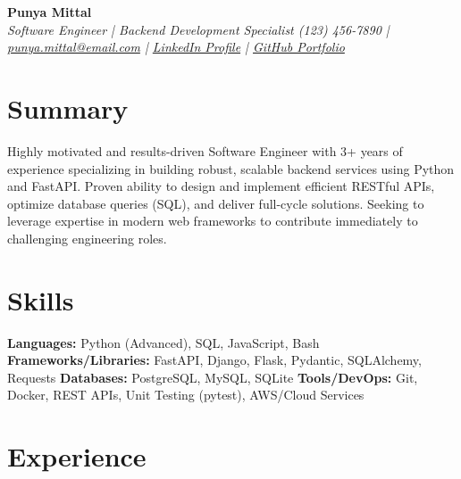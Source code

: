 \documentclass[10pt, letterpaper]{article}
\begin{document}
\begin{center}
    \Huge \textbf{Punya Mittal} \\
    \vspace{2pt}
    \em Software Engineer | Backend Development Specialist
    \vspace{4pt}
    \small 
    (123) 456-7890 | \href{mailto:punya.mittal@email.com}{punya.mittal@email.com} | 
    \href{https://linkedin.com/in/punyamittal}{LinkedIn Profile} | 
    \href{https://github.com/punyamittal}{GitHub Portfolio}
\end{center}

\section*{Summary}
Highly motivated and results-driven Software Engineer with 3+ years of experience specializing in building robust, scalable backend services using Python and FastAPI. Proven ability to design and implement efficient RESTful APIs, optimize database queries (SQL), and deliver full-cycle solutions. Seeking to leverage expertise in modern web frameworks to contribute immediately to challenging engineering roles.

\section*{Skills}
\textbf{Languages:} Python (Advanced), SQL, JavaScript, Bash
\textbf{Frameworks/Libraries:} FastAPI, Django, Flask, Pydantic, SQLAlchemy, Requests
\textbf{Databases:} PostgreSQL, MySQL, SQLite
\textbf{Tools/DevOps:} Git, Docker, REST APIs, Unit Testing (pytest), AWS/Cloud Services

\section*{Experience}
\end{document}

